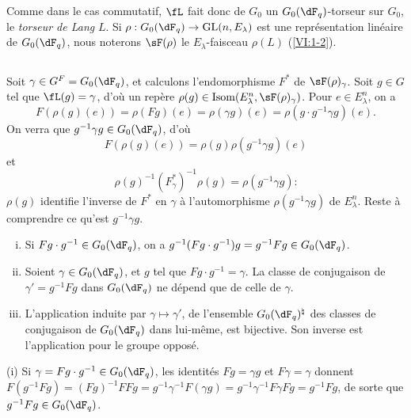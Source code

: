 Comme dans le cas commutatif, $\fL$ fait donc de $G_0$ un $G_0(\dF_q)$-torseur 
sur $G_0$, le \emph{torseur de Lang} $L$. Si 
$\rho:G_0(\dF_q) \to \gl(n,E_\lambda)$ est une repr\'esentation lin\'eaire de 
$G_0(\dF_q)$, nous noterons $\sF(\rho)$ le $E_\lambda$-faisceau $\rho(L)$ 
(\ref{VI:1-2}). 





\subsection{}\label{VI:1-23}

Soit $\gamma\in G^F=G_0(\dF_q)$, et calculons l'endomorphisme $F^\ast$ de 
$\sF(\rho)_\gamma$. Soit $g\in G$ tel que $\fL(g)=\gamma$, d'o\`u un rep\`ere 
$\rho(g)\in \operatorname{Isom}(E_\lambda^n,\sF(\rho)_\gamma)$. Pour 
$e\in E_\lambda^n$, on a 
\[
  F(\rho(g)(e)) = \rho(F g)(e) = \rho(\gamma g)(e) = \rho(g\cdot g^{-1}\gamma g)(e) \text{.}
\]
On verra que $g^{-1} \gamma g\in G_0(\dF_q)$, d'o\`u 
\[
  F(\rho(g)(e)) = \rho(g) \rho(g^{-1}\gamma g)(e)
\]
et 
\begin{equation*}\tag{1.23.1}\label{VI:eq:1-23-1}
  \rho(g)^{-1} (F_\gamma^\ast)^{-1} \rho(g) = \rho(g^{-1} \gamma g) \text{:}
\end{equation*}
$\rho(g)$ identifie l'inverse de $F^\ast$ en $\gamma$ \`a l'automorphisme 
$\rho(g^{-1} \gamma g)$ de $E_\lambda^n$. Reste \`a comprendre ce qu'est 
$g^{-1} \gamma g$. 





\begin{lemma_}\label{VI:1-24}
\begin{enumerate}[(i)]
  \item Si $F g\cdot g^{-1} \in G_0(\dF_q)$, on a 
    $g^{-1} (F g\cdot g^{-1}) g = g^{-1} F g\in G_0(\dF_q)$.
  \item Soient $\gamma\in G_0(\dF_q)$, et $g$ tel que 
    $F g\cdot g^{-1} = \gamma$. La classe de conjugaison de $\gamma'=g^{-1} Fg$ 
    dans $G_0(\dF_q)$ ne d\'epend que de celle de $\gamma$. 
  \item L'application induite par $\gamma\mapsto \gamma'$, de l'ensemble 
    $G_0(\dF_q)^\natural$ des classes de conjugaison de $G_0(\dF_q)$ dans 
    lui-m\^eme, est bijective. Son inverse est l'application pour le groupe 
    oppos\'e. 
\end{enumerate}
\end{lemma_}

(i) Si $\gamma= F g\cdot g^{-1}\in G_0(\dF_q)$, les identit\'es $F g=\gamma g$ 
et 
$F\gamma=\gamma$ donnent $F(g^{-1} F g) = (F g)^{-1} F F g = g^{-1} \gamma^{-1} F(\gamma g) = g^{-1} \gamma^{-1} F \gamma F g = g^{-1} F g$, 
de sorte que $g^{-1} F g \in G_0(\dF_q)$. 

